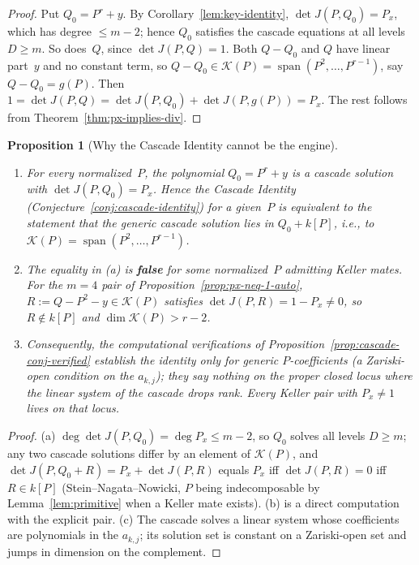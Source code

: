 \documentclass[12pt,a4paper]{article}
\newtheorem{proposition}[theorem]{Proposition}
\theoremstyle{definition}
\newcommand{\kk}{k}
\begin{document}
\begin{proof}
Put $Q_0 = P^r + y$. By Corollary~\ref{lem:key-identity},
$\det J(P, Q_0) = P_x$, which has degree $\leq m-2$; hence
$Q_0$ satisfies the cascade equations at all levels $D \geq m$.
So does~$Q$, since $\det J(P,Q) = 1$. Both $Q - Q_0$ and $Q$ have
linear part~$y$ and no constant term, so
$Q - Q_0 \in \mathcal{K}(P) = \operatorname{span}(P^2, \ldots, P^{r-1})$,
say $Q - Q_0 = g(P)$. Then
$1 = \det J(P,Q) = \det J(P, Q_0) + \det J(P, g(P)) = P_x$.
The rest follows from Theorem~\ref{thm:px-implies-div}.
\end{proof}

\begin{proposition}[Why the Cascade Identity cannot be the engine]%
\label{prop:cascade-identity-demystified}
\leavevmode
\begin{enumerate}
\item[\textup{(a)}] For every normalized~$P$, the polynomial
  $Q_0 = P^r + y$ is a cascade solution with
  $\det J(P, Q_0) = P_x$. Hence the Cascade Identity
  \textup{(Conjecture~\ref{conj:cascade-identity})} for a given~$P$
  is \emph{equivalent} to the statement that the generic cascade solution
  lies in $Q_0 + \kk[P]$, i.e., to
  $\mathcal{K}(P) = \operatorname{span}(P^2, \ldots, P^{r-1})$.
\item[\textup{(b)}] The equality in \textup{(a)} is \textbf{false}
  for some normalized~$P$ admitting Keller mates.
  For the $m = 4$ pair of Proposition~\ref{prop:px-neq-1-auto},
  $R := Q - P^2 - y \in \mathcal{K}(P)$ satisfies
  $\det J(P, R) = 1 - P_x \neq 0$, so $R \notin \kk[P]$ and
  $\dim \mathcal{K}(P) > r - 2$.
\item[\textup{(c)}] Consequently, the computational verifications of
  Proposition~\ref{prop:cascade-conj-verified} establish the identity
  only for \emph{generic} $P$-coefficients (a Zariski-open condition on
  the $a_{k,j}$); they say nothing on the proper closed locus where the
  linear system of the cascade drops rank. Every Keller pair with
  $P_x \neq 1$ lives on that locus.
\end{enumerate}
\end{proposition}

\begin{proof}
(a) $\deg \det J(P, Q_0) = \deg P_x \leq m - 2$, so $Q_0$ solves all
levels $D \geq m$; any two cascade solutions differ by an element of
$\mathcal{K}(P)$, and $\det J(P, Q_0 + R) = P_x + \det J(P, R)$ equals
$P_x$ iff $\det J(P,R) = 0$ iff $R \in \kk[P]$ (Stein--Nagata--Nowicki,
$P$ being indecomposable by Lemma~\ref{lem:primitive} when a Keller mate
exists). (b) is a direct computation with the explicit pair.
(c) The cascade solves a linear system whose coefficients are polynomials
in the $a_{k,j}$; its solution set is constant on a Zariski-open set and
jumps in dimension on the complement.
\end{proof}
\end{document}

